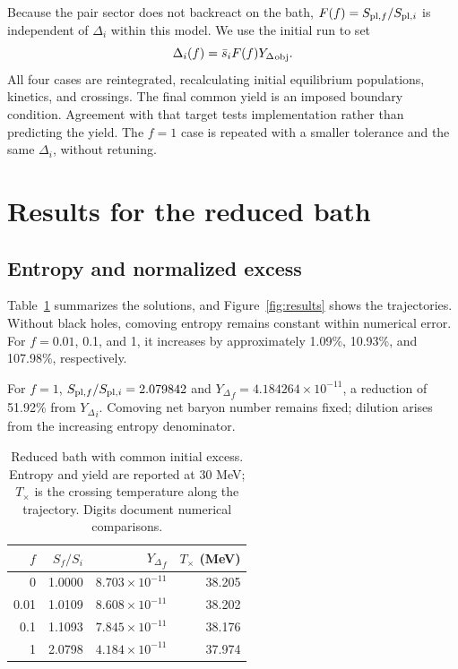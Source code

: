 \documentclass[10pt,a4paper,twocolumn]{article}
\newcommand{\Y}{{Y_\Delta}}
\newcommand{\sbar}{\bar s}
\begin{document}
Because the pair sector does not backreact on the bath, $F(f)=S_{{\rm pl},f}/S_{{\rm pl},i}$ is independent of $\Delta_i$ within this model. We use the initial run to set
\begin{equation}\label{eq:boundary}
\Delta_i(f)=\sbar_i F(f)\Y_{\rm obj}.
\end{equation}
All four cases are reintegrated, recalculating initial equilibrium populations, kinetics, and crossings. The final common yield is an imposed boundary condition. Agreement with that target tests implementation rather than predicting the yield. The $f=1$ case is repeated with a smaller tolerance and the same $\Delta_i$, without retuning.

\section{Results for the reduced bath}
\subsection{Entropy and normalized excess}
Table~\ref{tab:results} summarizes the solutions, and Figure~\ref{fig:results} shows the trajectories. Without black holes, comoving entropy remains constant within numerical error. For $f=0.01$, 0.1, and 1, it increases by approximately 1.09\%, 10.93\%, and 107.98\%, respectively.

For $f=1$, $S_{{\rm pl},f}/S_{{\rm pl},i}=2.079842$ and $\Y_f=4.184264\times10^{-11}$, a reduction of 51.92\% from $\Y_i$. Comoving net baryon number remains fixed; dilution arises from the increasing entropy denominator.

\begin{table}[t]
\centering\small
\caption{Reduced bath with common initial excess. Entropy and yield are reported at 30 MeV; $T_\times$ is the crossing temperature along the trajectory. Digits document numerical comparisons.}\label{tab:results}
\begin{tabular}{rrrr}\toprule
$f$&$S_f/S_i$&$\Y_f$&$T_\times$ (MeV)\\\midrule
0&1.0000&$8.703\times10^{-11}$&38.205\\
0.01&1.0109&$8.608\times10^{-11}$&38.202\\
0.1&1.1093&$7.845\times10^{-11}$&38.176\\
1&2.0798&$4.184\times10^{-11}$&37.974\\\bottomrule
\end{tabular}
\end{table}
\end{document}
